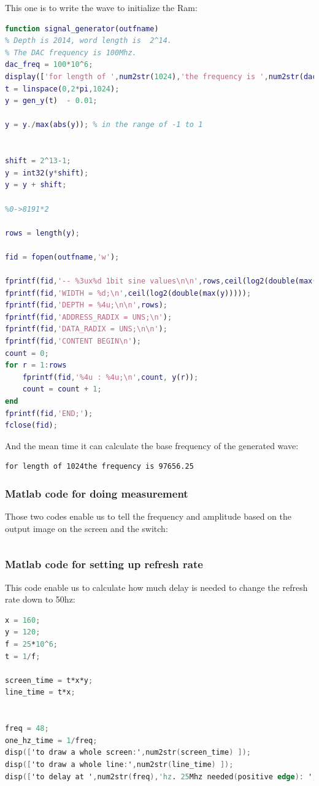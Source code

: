 \documentclass[11pt]{scrartcl}
\begin{document}
This one is to write the wave to initialize the Ram:
\begin{lstlisting}[language=Matlab]
function signal_generator(outfname)
% Depth is 2014, word length is  2^14.
% The DAC frequency is 100Mhz.
dac_freq = 100*10^6;
display(['for length of ',num2str(1024),'the frequency is ',num2str(dac_freq/1024)])
t = linspace(0,2*pi,1024);
y = gen_y(t)  - 0.01;

y = y./max(abs(y)); % in the range of -1 to 1


shift = 2^13-1;
y = int32(y*shift);
y = y + shift;

%0->8191*2

rows = length(y);

fid = fopen(outfname,'w');

fprintf(fid,'-- %3ux%d 1bit sine values\n\n',rows,ceil(log2(double(max(y)))));
fprintf(fid,'WIDTH = %d;\n',ceil(log2(double(max(y)))));
fprintf(fid,'DEPTH = %4u;\n\n',rows);
fprintf(fid,'ADDRESS_RADIX = UNS;\n');
fprintf(fid,'DATA_RADIX = UNS;\n\n');
fprintf(fid,'CONTENT BEGIN\n');
count = 0;
for r = 1:rows
    fprintf(fid,'%4u : %4u;\n',count, y(r));
    count = count + 1;
end
fprintf(fid,'END;');
fclose(fid);
\end{lstlisting}

And the mean time it can calculate the base frequency of the generated wave:
\begin{verbatim}
for length of 1024the frequency is 97656.25
\end{verbatim}



\subsubsection{Matlab code for doing measurement}

Those two codes enable us to tell the frequency and amplitude based on the output image on the screen and the switch:
\begin{lstlisting}[language=Verilog]

\end{lstlisting}

\subsubsection{Matlab code for setting up refresh rate}

This code enable us to calculate how much delay is needed to change the refresh rate down to 50hz:
\begin{lstlisting}[language=Verilog]
x = 160;
y = 120;
f = 25*10^6;
t = 1/f;

screen_time = t*x*y;
line_time = t*x;


freq = 48;
one_hz_time = 1/freq;
disp(['to draw a whole screen:',num2str(screen_time) ]);
disp(['to draw a whole line:',num2str(line_time) ]);
disp(['to delay at ',num2str(freq),'hz. 25Mhz needed(positive edge): ',num2str(one_hz_time/t),'. bit needed ',num2str(ceil(log2(one_hz_time/t)))]);
\end{lstlisting}
\end{document}
